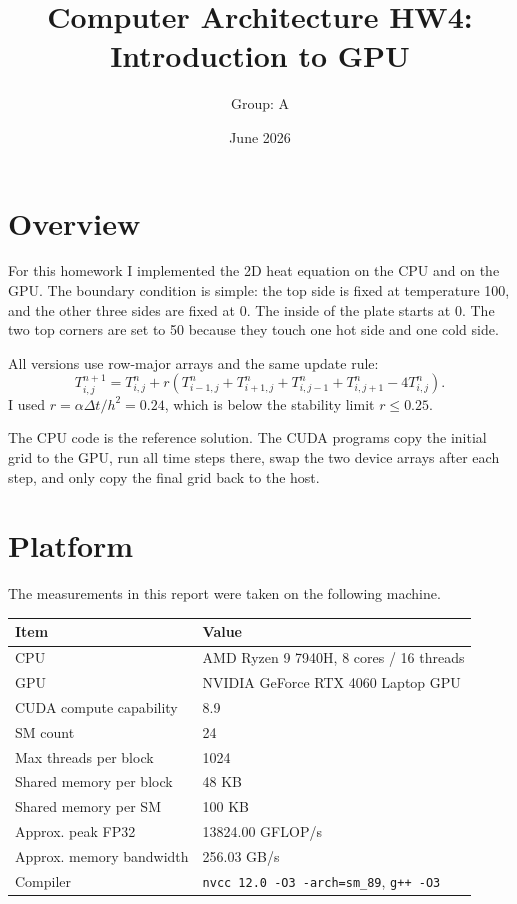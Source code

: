 \documentclass[11pt]{article}
\title{Computer Architecture HW4: Introduction to GPU}
\author{Group: A}
\date{June 2026}
\begin{document}
\maketitle

\section{Overview}

For this homework I implemented the 2D heat equation on the CPU and on the GPU.
The boundary condition is simple: the top side is fixed at temperature 100, and
the other three sides are fixed at 0. The inside of the plate starts at 0. The
two top corners are set to 50 because they touch one hot side and one cold side.

All versions use row-major arrays and the same update rule:
\[
T_{i,j}^{n+1} =
T_{i,j}^{n} +
r \left(T_{i-1,j}^{n}+T_{i+1,j}^{n}
+T_{i,j-1}^{n}+T_{i,j+1}^{n}-4T_{i,j}^{n}\right).
\]
I used \(r=\alpha \Delta t/h^2=0.24\), which is below the stability limit
\(r \le 0.25\).

The CPU code is the reference solution. The CUDA programs copy the initial grid
to the GPU, run all time steps there, swap the two device arrays after each
step, and only copy the final grid back to the host.

\section{Platform}

The measurements in this report were taken on the following machine.

\begin{center}
\begin{tabular}{ll}
\toprule
Item & Value \\
\midrule
CPU & AMD Ryzen 9 7940H, 8 cores / 16 threads \\
GPU & NVIDIA GeForce RTX 4060 Laptop GPU \\
CUDA compute capability & 8.9 \\
SM count & 24 \\
Max threads per block & 1024 \\
Shared memory per block & 48 KB \\
Shared memory per SM & 100 KB \\
Approx. peak FP32 & 13824.00 GFLOP/s \\
Approx. memory bandwidth & 256.03 GB/s \\
Compiler & \texttt{nvcc 12.0 -O3 -arch=sm\_89}, \texttt{g++ -O3} \\
\bottomrule
\end{tabular}
\end{center}
\end{document}
